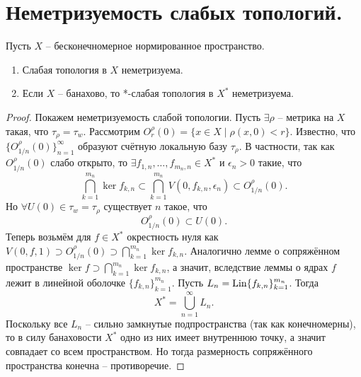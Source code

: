 \section{Неметризуемость слабых топологий.}\label{seq:unmetrizability}
\begin{theorem}
    Пусть $X$ -- бесконечномерное нормированное пространство.
    \begin{enumerate}
        \item Слабая топология в $X$ неметризуема.
        \item Если $X$ -- банахово, то *-слабая топология в $X^*$ неметризуема.
    \end{enumerate}
\end{theorem}
\begin{proof}
    Покажем неметризуемость слабой топологии.
    Пусть $\exists \rho$ -- метрика на $X$ такая, что $\tau_{\rho} = \tau_w$.
    Рассмотрим $O_r^\rho(0) = \{x \in X \mid \rho(x, 0) < r\}$.
    Известно, что $\{O_{1/n}^{\rho}(0)\}_{n = 1}^{\infty}$ образуют счётную локальную базу $\tau_\rho$.
    В частности, так как $O_{1/n}^{\rho}(0)$ слабо открыто, то $\exists f_{1, n}, \ldots, f_{m_n, n} \in X^*$ и $\epsilon_n > 0$ такие, что
    \[
        \bigcap_{k = 1}^{m_n} \ker f_{k, n} \subset \bigcap_{k = 1}^{m_n} V(0, f_{k, n}, \epsilon_n) \subset O^{\rho}_{1/n}(0).
    \]
    Но $\forall U(0) \in \tau_w = \tau_\rho$ существует $n$ такое, что
    \[
        O_{1/n}^{\rho}(0) \subset U(0).
    \]
    Теперь возьмём для $f \in X^*$ окрестность нуля как $V(0, f, 1) \supset O_{1/n}^{\rho}(0) \supset \bigcap_{k = 1}^{m_n} \ker f_{k, n}$.
    Аналогично лемме о сопряжённом пространстве $\ker f \supset \bigcap_{k = 1}^{m_n} \ker f_{k, n}$, а значит, вследствие леммы о ядрах $f$ лежит в линейной оболочке $\{f_{k, n}\}_{k = 1}^{m_n}$.
    Пусть $L_n = \operatorname{Lin}\{f_{k, n}\}_{k = 1}^{m_n}$.
    Тогда
    \[
        X^* = \bigcup_{n = 1}^{\infty} L_n.
    \]
    Поскольку все $L_n$ -- сильно замкнутые подпространства (так как конечномерны), то в силу банаховости $X^*$ одно из них имеет внутреннюю точку, а значит совпадает со всем пространством.
    Но тогда размерность сопряжённого пространства конечна -- противоречие.


\end{proof}
